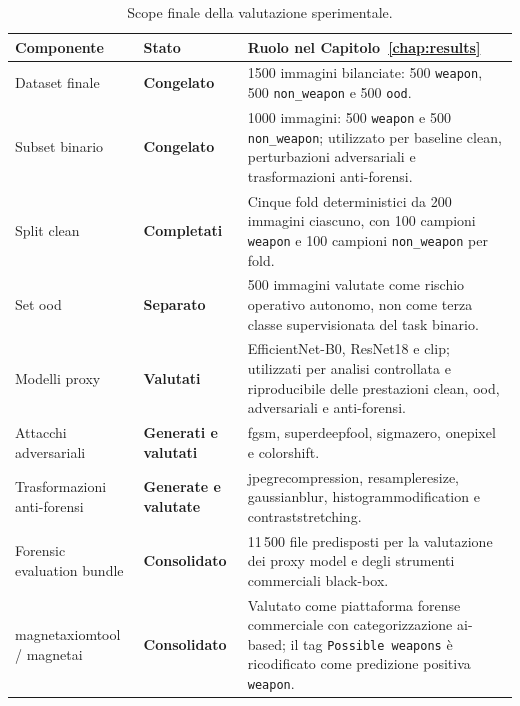 \begin{table}[H]
\centering
\scriptsize
\renewcommand{\arraystretch}{1.15}
\setlength{\tabcolsep}{4pt}
\caption{Scope finale della valutazione sperimentale.}
\label{tab:results-evaluation-scope}
\begin{tabularx}{\textwidth}{@{}p{} p{} X@{}}
\toprule
\textbf{Componente} & \textbf{Stato} & \textbf{Ruolo nel Capitolo~\ref{chap:results}} \\
\midrule

Dataset finale &
\textbf{Congelato} &
1500 immagini bilanciate: 500 \texttt{weapon}, 500 \texttt{non\_weapon} e
500 \texttt{ood}. \\

Subset binario &
\textbf{Congelato} &
1000 immagini: 500 \texttt{weapon} e 500 \texttt{non\_weapon}; utilizzato per
baseline clean, perturbazioni adversariali e trasformazioni anti-forensi. \\

Split clean &
\textbf{Completati} &
Cinque fold deterministici da 200 immagini ciascuno, con 100 campioni
\texttt{weapon} e 100 campioni \texttt{non\_weapon} per fold. \\

Set \gls{ood} &
\textbf{Separato} &
500 immagini valutate come rischio operativo autonomo, non come terza classe
supervisionata del task binario. \\

Modelli proxy &
\textbf{Valutati} &
EfficientNet-B0, ResNet18 e \gls{clip}; utilizzati per analisi controllata e
riproducibile delle prestazioni clean, \gls{ood}, adversariali e anti-forensi. \\

Attacchi adversariali &
\textbf{Generati e valutati} &
\gls{fgsm}, \gls{superdeepfool}, \gls{sigmazero}, \gls{onepixel} e
\gls{colorshift}. \\

Trasformazioni anti-forensi &
\textbf{Generate e valutate} &
\gls{jpegrecompression}, \gls{resampleresize}, \gls{gaussianblur},
\gls{histogrammodification} e \gls{contraststretching}. \\

Forensic evaluation bundle &
\textbf{Consolidato} &
11\,500 file predisposti per la valutazione dei proxy model e degli strumenti
commerciali black-box. \\

\gls{magnetaxiomtool} / \gls{magnetai} &
\textbf{Consolidato} &
Valutato come piattaforma forense commerciale con categorizzazione
\gls{ai}-based; il tag \texttt{Possible weapons} è ricodificato come predizione
positiva \texttt{weapon}. \\


\end{tabularx}
\end{table}
